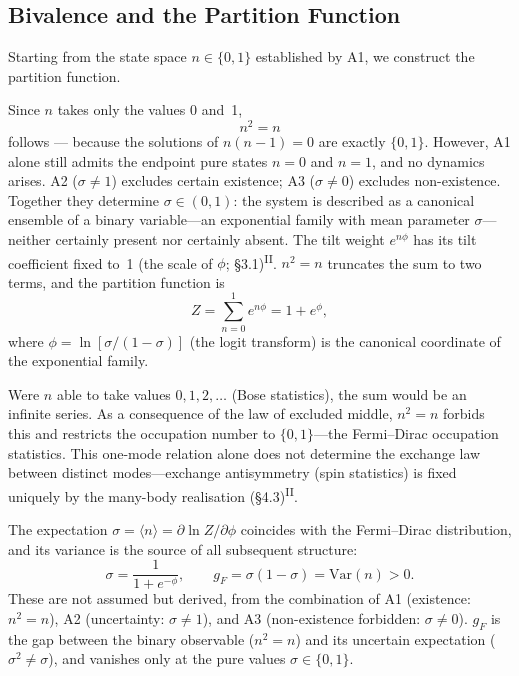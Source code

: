 \documentclass[12pt,a4paper]{article}
\newcommand{\PII}{\textsuperscript{\textup{II}}}
\begin{document}
\subsection{Bivalence and the Partition Function}\label{sec:partition}

Starting from the state space $n \in \{0,1\}$ established by A1,
we construct the partition function.

Since $n$ takes only the values 0 and~1,
\begin{equation}\label{eq:idempotency}
  n^2 = n
\end{equation}
follows --- because the solutions of $n(n{-}1) = 0$ are exactly
$\{0,1\}$. However, A1 alone still admits the endpoint pure states
$n = 0$ and $n = 1$, and no dynamics arises.
A2 ($\sigma \neq 1$) excludes certain existence;
A3 ($\sigma \neq 0$) excludes non-existence.
Together they determine $\sigma \in (0,1)$:
the system is described as a canonical ensemble of a binary
variable---an exponential family with mean parameter $\sigma$---neither
certainly present nor certainly absent. The tilt weight $e^{n\phi}$ has its tilt coefficient fixed to~1 (the scale of $\phi$; \S3.1)\PII{}.
$n^2 = n$ truncates the sum to two terms, and the partition
function is
\begin{equation}
  Z = \sum_{n=0}^{1} e^{n\phi} = 1 + e^{\phi},
\end{equation}
where $\phi = \ln[\sigma/(1{-}\sigma)]$ (the logit transform) is
the canonical coordinate of the exponential family.

Were $n$ able to take values $0, 1, 2, \dots$ (Bose statistics), the sum would be an infinite series. As a consequence of the law of excluded middle, $n^2 = n$ forbids this and restricts the occupation number to $\{0,1\}$---the Fermi--Dirac occupation statistics. This one-mode relation alone does not determine the exchange law between distinct modes---exchange antisymmetry (spin statistics) is fixed uniquely by the many-body realisation (\S4.3)\PII{}.

The expectation
$\sigma = \langle n \rangle = \partial\ln Z/\partial\phi$
coincides with the Fermi--Dirac distribution, and its variance is
the source of all subsequent structure:
\begin{equation}
  \sigma = \frac{1}{1+e^{-\phi}}, \qquad
  g_F = \sigma(1{-}\sigma) = \mathrm{Var}(n) > 0.
\end{equation}
These are not assumed but derived, from the combination of A1
(existence: $n^2 = n$), A2 (uncertainty: $\sigma \neq 1$),
and A3 (non-existence forbidden: $\sigma \neq 0$). $g_F$ is the gap between the
binary observable ($n^2 = n$) and its uncertain expectation
($\sigma^2 \neq \sigma$), and vanishes only at the pure values
$\sigma \in \{0,1\}$.
\end{document}
